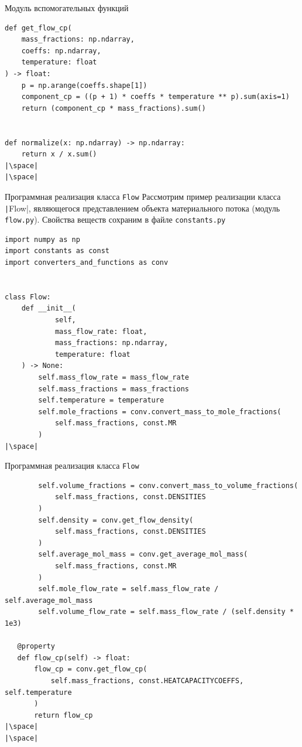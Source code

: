 \documentclass[aspectratio=169, mathserif]{beamer}	%
\begin{document}
\begin{frame}[fragile]{Модуль вспомогательных функций}
\scriptsize
\begin{verbatim}
def get_flow_cp(
    mass_fractions: np.ndarray,
    coeffs: np.ndarray,
    temperature: float
) -> float:
    p = np.arange(coeffs.shape[1])
    component_cp = ((p + 1) * coeffs * temperature ** p).sum(axis=1)
    return (component_cp * mass_fractions).sum()


def normalize(x: np.ndarray) -> np.ndarray:
    return x / x.sum()
|\space|
|\space|
\end{verbatim}
\vfill
\end{frame}

\begin{frame}[fragile]{Программная реализация класса \texttt{Flow}}
\scriptsize
Рассмотрим пример реализации класса \texttt|Flow|, являющегося представлением объекта материального потока (модуль \texttt{flow.py}). Свойства веществ сохраним в файле \texttt{constants.py}
\vfill
\begin{verbatim}
import numpy as np
import constants as const
import converters_and_functions as conv


class Flow:
    def __init__(
            self,
            mass_flow_rate: float,
            mass_fractions: np.ndarray,
            temperature: float
    ) -> None:
        self.mass_flow_rate = mass_flow_rate
        self.mass_fractions = mass_fractions
        self.temperature = temperature
        self.mole_fractions = conv.convert_mass_to_mole_fractions(
            self.mass_fractions, const.MR
        )
|\space|
\end{verbatim}
\vfill
\end{frame}

\begin{frame}[fragile]{Программная реализация класса \texttt{Flow}}
\scriptsize
\begin{verbatim}
        self.volume_fractions = conv.convert_mass_to_volume_fractions(
            self.mass_fractions, const.DENSITIES
        )
        self.density = conv.get_flow_density(
            self.mass_fractions, const.DENSITIES
        )
        self.average_mol_mass = conv.get_average_mol_mass(
            self.mass_fractions, const.MR
        )
        self.mole_flow_rate = self.mass_flow_rate / self.average_mol_mass
        self.volume_flow_rate = self.mass_flow_rate / (self.density * 1e3)

   @property
   def flow_cp(self) -> float:
       flow_cp = conv.get_flow_cp(
           self.mass_fractions, const.HEATCAPACITYCOEFFS, self.temperature
       )
       return flow_cp
|\space|
|\space|
\end{verbatim}
\vfill
\end{frame}
\end{document}

